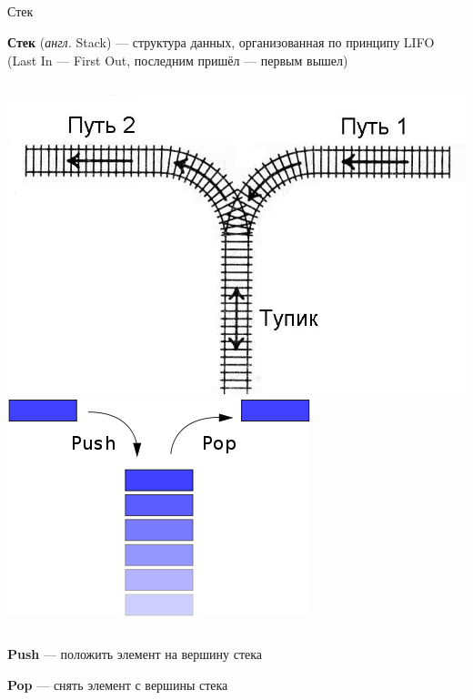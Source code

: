 \documentclass[utf8, russian]{beamer}
\begin{document}
    \subsection{}
    \begin{frame}{Стек}

        {\bf Стек } ({\it англ.} Stack) --- структура данных, организованная по принципу LIFO (Last In --- First Out, последним пришёл --- первым вышел)
    \begin{columns}
            \includegraphics[width=\linewidth]{fig/stack_rails.jpg}
            \includegraphics[width=\linewidth]{fig/stack.png}
    \end{columns}
    {\bf Push} --- положить элемент на вершину стека

    {\bf Pop} --- снять элемент с вершины стека
    \end{frame}
\end{document}
